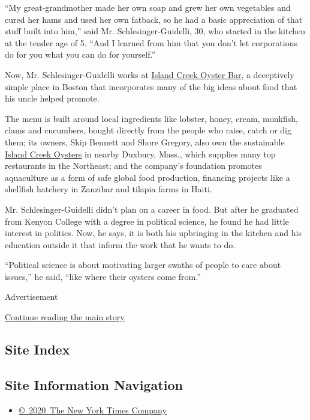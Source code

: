 ``My great-grandmother made her own soap and grew her own vegetables and
cured her hams and used her own fatback, so he had a basic appreciation
of that stuff built into him,'' said Mr. Schlesinger-Guidelli, 30, who
started in the kitchen at the tender age of 5. ``And I learned from him
that you don't let corporations do for you what you can do for
yourself.''

Now, Mr. Schlesinger-Guidelli works at
\href{http://islandcreekoysterbar.com/}{Island Creek Oyster Bar}, a
deceptively simple place in Boston that incorporates many of the big
ideas about food that his uncle helped promote.

The menu is built around local ingredients like lobster, honey, cream,
monkfish, clams and cucumbers, bought directly from the people who
raise, catch or dig them; its owners, Skip Bennett and Shore Gregory,
also own the sustainable
\href{http://www.islandcreekoysters.com/}{Island Creek Oysters} in
nearby Duxbury, Mass., which supplies many top restaurants in the
Northeast; and the company's foundation promotes aquaculture as a form
of safe global food production, financing projects like a shellfish
hatchery in Zanzibar and tilapia farms in Haiti.

Mr. Schlesinger-Guidelli didn't plan on a career in food. But after he
graduated from Kenyon College with a degree in political science, he
found he had little interest in politics. Now, he says, it is both his
upbringing in the kitchen and his education outside it that inform the
work that he wants to do.

``Political science is about motivating larger swaths of people to care
about issues,'' he said, ``like where their oysters come from.''

Advertisement

\protect\hyperlink{after-bottom}{Continue reading the main story}

\hypertarget{site-index}{%
\subsection{Site Index}\label{site-index}}

\hypertarget{site-information-navigation}{%
\subsection{Site Information
Navigation}\label{site-information-navigation}}

\begin{itemize}
\tightlist
\item
  \href{https://help.nytimes3xbfgragh.onion/hc/en-us/articles/115014792127-Copyright-notice}{©~2020~The
  New York Times Company}
\end{itemize}

